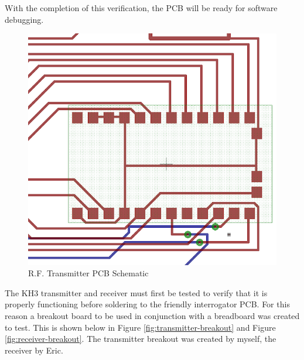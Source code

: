 \documentclass[letterpaper,10pt]{article}
\begin{document}
\begin{spacing}{1.15}
With the completion of this verification, the PCB will be ready for software debugging. 
\begin{figure} [H]
	\centering
	\includegraphics[scale=0.8]{rf-transmitter-pcb.png}
	\caption{R.F. Transmitter PCB Schematic\label{fig:rf-transmitter-pcb}}
\end{figure}

The KH3 transmitter and receiver must first be tested to verify that it is properly functioning before soldering to the friendly interrogator PCB. For this reason a breakout board to be used in conjunction with a breadboard was created to test. This is shown below in Figure \ref{fig:transmitter-breakout} and Figure \ref{fig:receiver-breakout}. The transmitter breakout was created by myself, the receiver by Eric.


\end{spacing}
\end{document}
